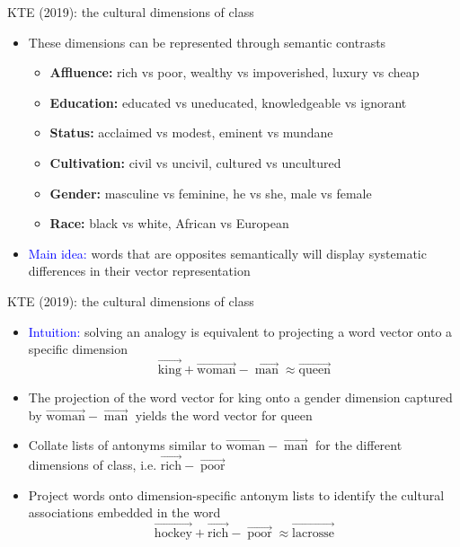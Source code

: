 \documentclass[usenames,dvipsnames,english]{beamer}
\begin{document}
\begin{frame}{KTE (2019): the cultural dimensions of class}
    \begin{itemize}
    \setlength{\itemsep}{1.5em}
        \item These dimensions can be represented through semantic contrasts
        \begin{itemize}
        \setlength{\itemsep}{0.8em}
\vspace{10pt}
            \item \textbf{Affluence:} rich vs poor, wealthy vs impoverished, luxury vs cheap
            \item \textbf{Education:} educated vs uneducated, knowledgeable vs ignorant
            \item \textbf{Status:} acclaimed vs modest, eminent vs mundane 
            \item \textbf{Cultivation:} civil vs uncivil, cultured vs uncultured
            \item \textbf{Gender:} masculine vs feminine, he vs she, male vs female
            \item \textbf{Race:} black vs white, African vs European
        \end{itemize}
        \item \textcolor{blue}{Main idea:} words that are opposites semantically will display systematic differences in their vector representation
    \end{itemize}
\end{frame}
\begin{frame}{KTE (2019): the cultural dimensions of class}
    \begin{itemize}
    \setlength{\itemsep}{1.5em}
        \item \textcolor{blue}{Intuition:} solving an analogy is equivalent to projecting a word vector onto a specific dimension
$$\overrightarrow{\text {king}}+\overrightarrow{\text {woman}}-\overrightarrow{\operatorname{man}} \approx \overrightarrow{\text {queen}}$$
	\item {\small The projection of the word vector for king onto a gender dimension captured by $\overrightarrow{\text {woman}}-\overrightarrow{\operatorname{man}}$ yields the word vector for queen}
	\item Collate lists of antonyms similar to $\overrightarrow{\text {woman}}-\overrightarrow{\operatorname{man}}$ for the different dimensions of class, i.e. $\overrightarrow{\text {rich}}-\overrightarrow{\operatorname{poor}}$
	\item Project words onto dimension-specific antonym lists to identify the cultural associations embedded in the word
$$\overrightarrow{\text {hockey}}+\overrightarrow{\text {rich}}-\overrightarrow{\operatorname{poor}} \approx \overrightarrow{\text {lacrosse}}$$
    \end{itemize}
\end{frame}
\end{document}
